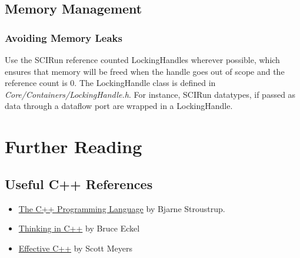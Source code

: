 \documentclass[fleqn,12pt,openany]{book}
\begin{document}
\section{Memory Management}

\subsection{Avoiding Memory Leaks}



Use the SCIRun reference counted LockingHandles wherever possible,
which ensures that memory will be freed when the handle goes out of scope
and the reference count is 0.
The LockingHandle class is defined in \emph{Core/Containers/LockingHandle.h}.
For instance, SCIRun datatypes, if passed as data through a dataflow port
are wrapped in a LockingHandle.


%
%
%
%

\chapter{Further Reading}

\section{Useful C++ References}

\begin{itemize}
\item
\href{http://www.research.att.com/~bs/3rd.html}{The C++ Programming Language} by Bjarne Stroustrup.
\item
\href{http://mindview.net/Books/TICPP/ThinkingInCPP2e.html}{Thinking in C++} by Bruce Eckel
\item
\href{http://www.aristeia.com/books.html}{Effective C++} by Scott Meyers
\end{itemize}
\end{document}
